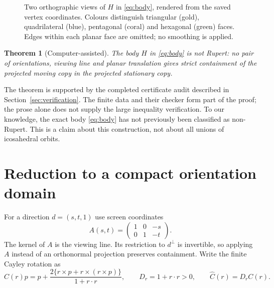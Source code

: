 \documentclass[11pt,a4paper]{article}
\newtheorem{theorem}{Theorem}
\newcommand{\HH}{H}
\begin{document}
\begin{figure}[htbp]
\caption{Two orthographic views of $\HH$ in \eqref{eq:body}, rendered from
the saved vertex coordinates. Colours distinguish triangular (gold),
quadrilateral (blue), pentagonal (coral) and hexagonal (green) faces.
Edges within each planar face are omitted; no smoothing is applied.}
\label{fig:solid}
\end{figure}

\begin{theorem}[Computer-assisted]\label{thm:main}
The body $\HH$ in \eqref{eq:body} is not Rupert: no pair of orientations,
viewing line and planar translation gives strict containment of the projected
moving copy in the projected stationary copy.
\end{theorem}

The theorem is supported by the completed certificate audit described in
Section~\ref{sec:verification}. The finite data and their checker form part
of the proof; the prose alone does not supply the large inequality verification.
To our knowledge, the exact body \eqref{eq:body} has not previously been
classified as non-Rupert. This is a claim about this construction, not about
all unions of icosahedral orbits.

\section{Reduction to a compact orientation domain}
For a direction $d=(s,t,1)$ use screen coordinates
\[
 A(s,t)=\begin{pmatrix}1&0&-s\\0&1&-t\end{pmatrix}.
\]
The kernel of $A$ is the viewing line. Its restriction to $d^\perp$ is invertible,
so applying $A$ instead of an orthonormal projection preserves containment.
Write the finite Cayley rotation as
\begin{equation}\label{eq:cayley}
 C(r)p=p+\frac{2\{r\times p+r\times(r\times p)\}}{1+r\cdot r},
 \qquad D_r=1+r\cdot r>0,\qquad \widehat C(r)=D_r C(r).
\end{equation}
\end{document}

